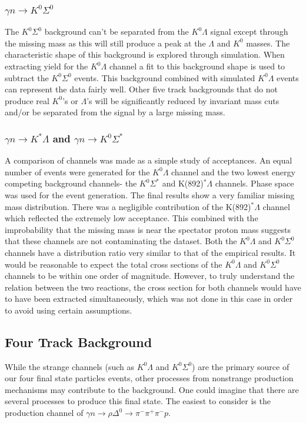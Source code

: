 \documentclass[prb,10pt,twocolumn,tightenlines,superscriptaddress]{revtex4-1}
\begin{document}
\subsubsection{$\gamma n \rightarrow K^{0}\Sigma^{0}$}
The $K^{0}\Sigma^{0}$ background can't be separated from the $K^{0}\Lambda$ signal except through the missing mass as this will still produce a peak at the $\Lambda$ and $K^{0}$ masses. The characteristic shape of this background is explored through simulation. When extracting yield for the $K^{0}\Lambda$ channel a fit to this background shape is used to subtract the $K^{0}\Sigma^{0}$ events. This background combined with simulated $K^{0}\Lambda$ events can represent the data fairly well. Other five track backgrounds that do not produce real $K^{0}$'s or $\Lambda$'s will be significantly reduced by invariant mass cuts and/or be separated from the signal by a large missing mass.

\subsubsection{$\gamma n \rightarrow K^{*}\Lambda$ and $\gamma n \rightarrow K^{0}\Sigma^{*}$}
A comparison of channels was made as a simple study of acceptances. An equal number of events were generated for the $K^{0}\Lambda$ channel and the two lowest energy competing background channels- the $K^{0}\Sigma^{*}$ and K(892)$^{*}\Lambda$  channels. Phase space was used for the event generation. The final results show a very familiar missing mass distribution. There was a negligible contribution of the K(892)$^{*}\Lambda$ channel which reflected the extremely low acceptance. This combined with the improbability that the missing mass is near the spectator proton mass suggests that these channels are not contaminating the dataset. Both the $K^{0}\Lambda$ and $K^{0}\Sigma^{0}$ channels have a distribution ratio very similar to that of the empirical results. It would be reasonable to expect the total cross sections of the $K^{0}\Lambda$ and $K^{0}\Sigma^{0}$ channels to be within one order of magnitude. However, to truly understand the relation between the two reactions, the cross section for both channels would have to have been extracted simultaneously, which was not done in this case in order to avoid using certain assumptions.

\subsection{Four Track Background} \label{sec:fourparticleback}
While the strange channels (such as $K^{0}\Lambda$ and $K^{0}\Sigma^{0}$) are the primary source of our four final state particles events, other processes from nonstrange production mechanisms may contribute to the background. One could imagine that there are several processes to produce this final state. The easiest to consider is the production channel of $\gamma n \rightarrow \rho\Delta^{0}\rightarrow \pi^{-}\pi^{+}\pi^{-}p$.
\end{document}
